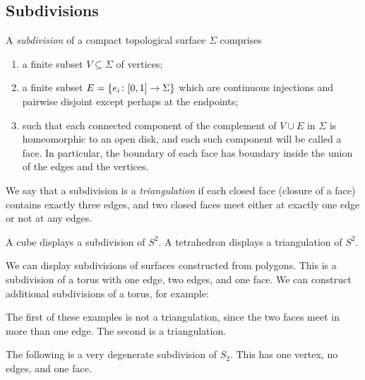 \subsection{Subdivisions}
\begin{definition}
	A \textit{subdivision} of a compact topological surface \( \Sigma \) comprises
	\begin{enumerate}
		\item a finite subset \( V \subseteq \Sigma \) of vertices;
		\item a finite subset \( E = \qty{e_i \colon [0,1] \to \Sigma} \) which are continuous injections and pairwise disjoint except perhaps at the endpoints;
		\item such that each connected component of the complement of \( V \cup E \) in \( \Sigma \) is homeomorphic to an open disk, and each such component will be called a face.
		      In particular, the boundary of each face has boundary inside the union of the edges and the vertices.
	\end{enumerate}
	We say that a subdivision is a \textit{triangulation} if each closed face (closure of a face) contains exactly three edges, and two closed faces meet either at exactly one edge or not at any edges.
\end{definition}
\begin{example}
	A cube displays a subdivision of \( S^2 \).
	A tetrahedron displays a triangulation of \( S^2 \).
\end{example}
\begin{example}
	We can display subdivisions of surfaces constructed from polygons.
	This is a subdivision of a torus with one edge, two edges, and one face.
	We can construct additional subdivisions of a torus, for example:
	\begin{center}
		 \quad {}
	\end{center}
	The first of these examples is not a triangulation, since the two faces meet in more than one edge.
	The second is a triangulation.
\end{example}
\begin{remark}
	The following is a very degenerate subdivision of \( S_2 \).
	This has one vertex, no edges, and one face.
\end{remark}

